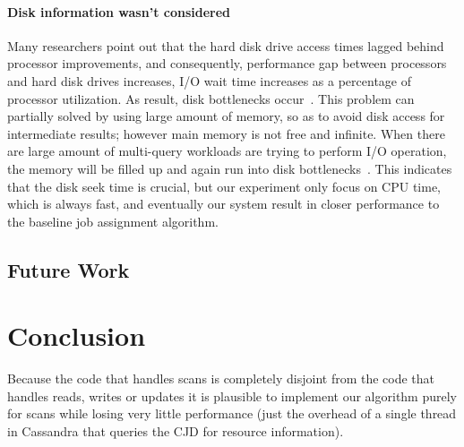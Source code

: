 \paragraph{Disk information wasn’t considered}
Many researchers point out that the hard disk drive access times lagged behind processor improvements, and consequently, performance gap between processors and hard disk drives increases, I/O wait time increases as a percentage of processor utilization. As result, disk bottlenecks occur~\cite{IBM-IO, TMS-SSD}. This problem can partially solved by using large amount of memory, so as to avoid disk access for intermediate results; however main memory is not free and infinite. When there are large amount of multi-query workloads are trying to perform I/O operation, the memory will be filled up and again run into disk bottlenecks~\cite{Bouganim:1998:MSL:288627.288646}. This indicates that the disk seek time is crucial, but our experiment only focus on CPU time, which is always fast, and eventually our system result in closer performance to the baseline job assignment algorithm.

\subsection{Future Work}


\section{Conclusion}
\label{sec:conclusion}

Because the code that handles scans is completely disjoint from the code that handles reads, writes or updates it is plausible to implement our algorithm purely for scans while losing very little performance (just the overhead of a single thread in Cassandra that queries the CJD for resource information).
